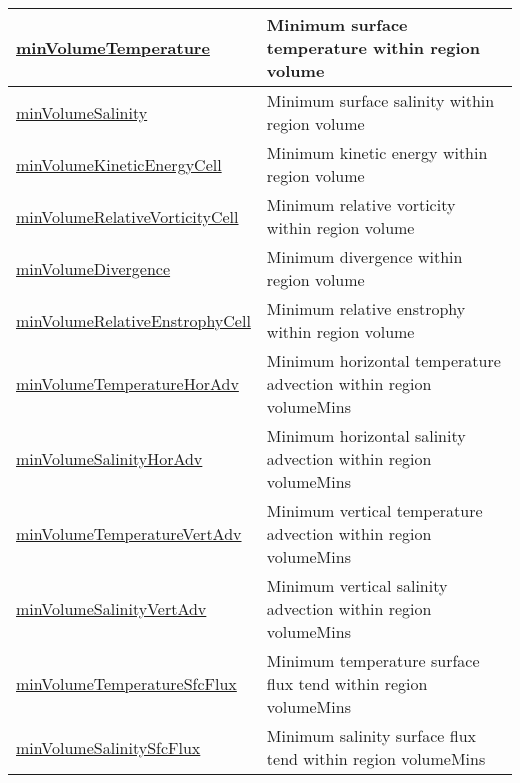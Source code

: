 {\begin{center}
\begin{longtable}{| p{2.0in} | p{4.0in} |}
    \hline
    \hyperref[subsec:var_sec_layerVolumeWeightedAverageAM_minVolumeTemperature]{minVolumeTemperature} & Minimum surface temperature within region volume \\
    \hline
    \hyperref[subsec:var_sec_layerVolumeWeightedAverageAM_minVolumeSalinity]{minVolumeSalinity} & Minimum surface salinity within region volume \\
    \hline
    \hyperref[subsec:var_sec_layerVolumeWeightedAverageAM_minVolumeKineticEnergyCell]{minVolumeKineticEnergyCell} & Minimum kinetic energy within region volume \\
    \hline
    \hyperref[subsec:var_sec_layerVolumeWeightedAverageAM_minVolumeRelativeVorticityCell]{minVolumeRelativeVorticityCell} & Minimum relative vorticity within region volume \\
    \hline
    \hyperref[subsec:var_sec_layerVolumeWeightedAverageAM_minVolumeDivergence]{minVolumeDivergence} & Minimum divergence within region volume \\
    \hline
    \hyperref[subsec:var_sec_layerVolumeWeightedAverageAM_minVolumeRelativeEnstrophyCell]{minVolumeRelativeEnstrophyCell} & Minimum relative enstrophy within region volume \\
    \hline
    \hyperref[subsec:var_sec_layerVolumeWeightedAverageAM_minVolumeTemperatureHorAdv]{minVolumeTemperatureHorAdv} & Minimum horizontal temperature advection within region volumeMins \\
    \hline
    \hyperref[subsec:var_sec_layerVolumeWeightedAverageAM_minVolumeSalinityHorAdv]{minVolumeSalinityHorAdv} & Minimum horizontal salinity advection within region volumeMins \\
    \hline
    \hyperref[subsec:var_sec_layerVolumeWeightedAverageAM_minVolumeTemperatureVertAdv]{minVolumeTemperatureVertAdv} & Minimum vertical temperature advection within region volumeMins \\
    \hline
    \hyperref[subsec:var_sec_layerVolumeWeightedAverageAM_minVolumeSalinityVertAdv]{minVolumeSalinityVertAdv} & Minimum vertical salinity advection within region volumeMins \\
    \hline
    \hyperref[subsec:var_sec_layerVolumeWeightedAverageAM_minVolumeTemperatureSfcFlux]{minVolumeTemperatureSfcFlux} & Minimum temperature surface flux tend within region volumeMins \\
    \hline
    \hyperref[subsec:var_sec_layerVolumeWeightedAverageAM_minVolumeSalinitySfcFlux]{minVolumeSalinitySfcFlux} & Minimum salinity surface flux tend within region volumeMins \\

\end{longtable}
\end{center}}
